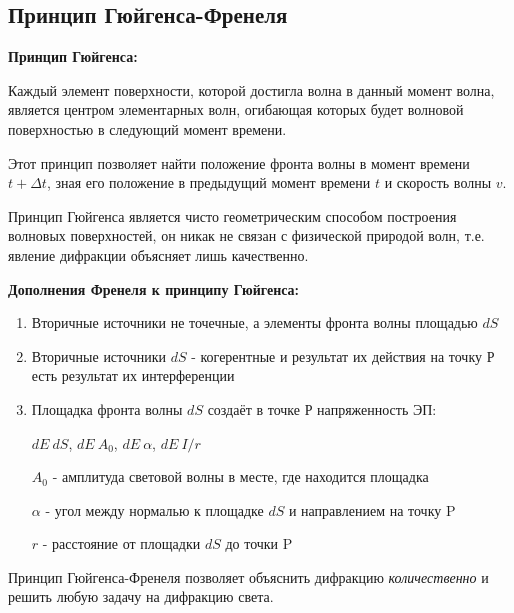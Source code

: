 \documentclass[12pt]{report}
\begin{document}
\subsection{Принцип Гюйгенса-Френеля}
\textbf{Принцип Гюйгенса:}\par
Каждый элемент поверхности, которой достигла волна в данный момент волна, является центром элементарных волн, огибающая которых будет волновой поверхностью в следующий момент времени.\par
Этот принцип позволяет найти положение фронта волны в момент времени $t + \Delta t$, зная его положение в предыдущий момент времени $t$ и скорость волны $v$.\par
Принцип Гюйгенса является чисто геометрическим способом построения волновых поверхностей, он никак не связан с физической природой волн, т.е. явление дифракции объясняет лишь качественно.\par
\textbf{Дополнения Френеля к принципу Гюйгенса:}\par
\begin{enumerate}
    \item Вторичные источники не точечные, а элементы фронта волны площадью $dS$\par
    \item Вторичные источники $dS$ - когерентные и результат их действия на точку Р есть результат их интерференции\par
    \item Площадка фронта волны $dS$ создаёт в точке Р напряженность ЭП:\par
          $dE ~ dS$, $dE ~ A_0$, $dE ~ \alpha$, $dE ~ I/r$\par
          $A_0$ - амплитуда световой волны в месте, где находится площадка\par
          $\alpha$ - угол между нормалью к площадке $dS$ и направлением на точку P\par
          $r$ - расстояние от площадки $dS$ до точки P\par
\end{enumerate}
Принцип Гюйгенса-Френеля позволяет объяснить дифракцию \textit{количественно} и решить любую задачу на дифракцию света.
\end{document}
